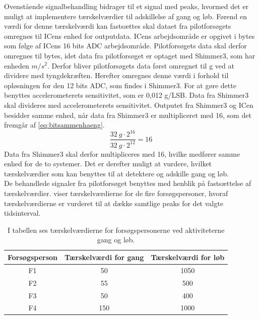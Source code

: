 Ovenstående signalbehandling bidrager til et signal med peaks, hvormed det er muligt at implementere tærskelværdier til adskillelse af gang og løb. Førend en værdi for denne tærskelværdi kan fastsættes skal dataet fra pilotforsøgets omregnes til ICens enhed for outputdata. ICens arbejdsområde er opgivet i bytes som følge af ICens 16 bits ADC arbejdsområde. Pilotforsøgets data skal derfor omregnes til bytes, idet data fra pilotforsøget er optaget med Shimmer3, som har enheden $m/s^{2}$. Derfor bliver pilotforsøgets data først omregnet til g ved at dividere med tyngdekræften. Herefter omregnes denne værdi i forhold til opløsningen for den 12 bits ADC, som findes i Shimmer3. For at gøre dette benyttes accelerometerets sensitivitet, som er 0,012 g/LSB. Data fra Shimmer3 skal divideres med accelerometerets sensitivitet. Outputet fra Shimmer3 og ICen besidder samme enhed, når data fra Shimmer3 er multipliceret med 16, som det fremgår af \eqref{eq:bitsammenhaeng}.
\begin{equation}
\frac{32~g \cdot 2^{16}}{32~g \cdot 2^{12}} = 16
\label{eq:bitsammenhaeng}
\end{equation}
Data fra Shimmer3 skal derfor multipliceres med 16, hvilke medfører samme enhed for de to systemer. Det er derefter muligt at vurdere, hvilket tærskelværdier som kan benyttes til at detektere og adskille gang og løb.\\
De behandlede signaler fra pilotforsøget benyttes med henblik på fastsættelse af tærskelværdier.  viser tærskelværdierne for de fire forsøgspersoner, hvoraf tærskelværdierne er vurderet til at dække samtlige peaks for det valgte tidsinterval. 
\begin{table}[H]
	\centering
	\begin{tabular}{ccc}
		\hline
		\rowcolor[HTML]{C0C0C0} 
		Forsøgsperson & Tærskelværdi for gang & Tærskelværdi for løb \\ \hline
		\rowcolor[HTML]{FFFFFF} 
		F1 & 50 & 1050 \\ \hline
		\rowcolor[HTML]{FFFFFF} 
		F2 & 55 & 500 \\ \hline
		\rowcolor[HTML]{FFFFFF} 
		F3 & 50 & 400 \\ \hline
		\rowcolor[HTML]{FFFFFF} 
		F4 & 150 & 1000 \\ \hline
	\end{tabular}
	\caption{I tabellen ses tærskelværdierne for forsøgspersonerne ved aktiviteterne gang og løb.}
	\label{tab:individuel_taerskel}
\end{table}\vspace{-0.25cm}
